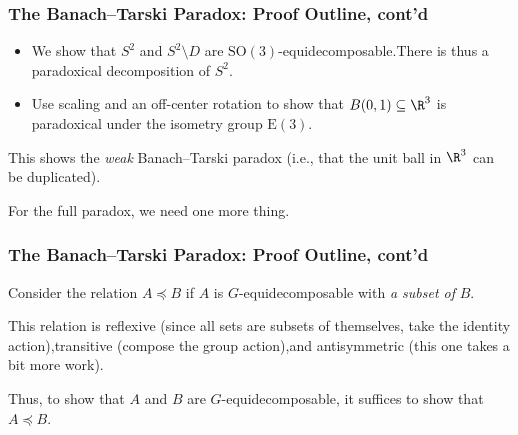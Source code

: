 \documentclass{beamer-custom}
\begin{document}
\begin{frame}
  \frametitle{The Banach--Tarski Paradox: Proof Outline, cont'd}
  \begin{itemize}
    \item We show that $S^{2}$ and $S^{2}\setminus D$ are $\text{SO}(3)$-equidecomposable.\pause\:There is thus a paradoxical decomposition of $S^{2}$.\pause
    \item Use scaling and an off-center rotation to show that $B(0,1)\subseteq \R^3$ is paradoxical under the isometry group $\text{E}(3)$.\pause
  \end{itemize}
  This shows the \textit{weak} Banach--Tarski paradox (i.e., that the unit ball in $\R^3$ can be duplicated).\pause\newline

  For the full paradox, we need one more thing.
\end{frame}
\begin{frame}
  \frametitle{The Banach--Tarski Paradox: Proof Outline, cont'd}
  Consider the relation $A\preceq B$ if $A$ is $G$-equidecomposable with \textit{a subset of} $B$.\pause\newline

  This relation is reflexive (since all sets are subsets of themselves, take the identity action),\pause\:transitive (compose the group action),\pause\:and antisymmetric (this one takes a bit more work).\pause\newline

  Thus, to show that $A$ and $B$ are $G$-equidecomposable, it suffices to show that $A\preceq B$.
\end{frame}
\end{document}
